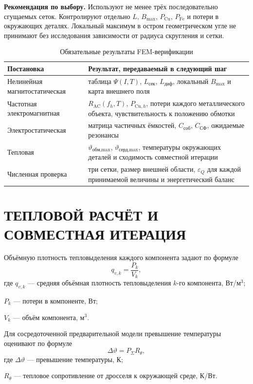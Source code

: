 \documentclass[14pt,a4paper]{extarticle}
\newcommand{\recommend}{\par\noindent\textbf{Рекомендация по выбору.} }
\begin{document}
\recommend Используют не менее трёх последовательно сгущаемых сеток.
Контролируют отдельно $L$, $B_{\max}$, $P_{\text{Cu}}$,
$P_{\text{Fe}}$ и потери в окружающих деталях. Локальный максимум в
остром геометрическом угле не принимают без исследования зависимости
от радиуса скругления и сетки.

\begin{table}[H]
\caption{Обязательные результаты FEM-верификации}
\label{tab:fem-results}
\centering
\small
\begin{tabularx}{\textwidth}{>{\raggedright\arraybackslash}p{50mm} X}
\toprule
Постановка & Результат, передаваемый в следующий шаг \\
\midrule
Нелинейная магнитостатическая &
таблица $\Psi(I,T)$, $L_{\text{сек}}$, $L_{\text{диф}}$, локальный
$B_{\max}$ и карта внешнего поля \\
Частотная электромагнитная &
$R_{\text{AC}}(f_h,T)$, $P_{\text{Cu},h}$, потери каждого металлического
объекта, чувствительность к положению обмотки \\
Электростатическая &
матрица частичных ёмкостей, $C_{\text{соб}}$, $C_{\text{СФ}}$, ожидаемые
резонансы \\
Тепловая &
$\vartheta_{\text{обм,max}}$, $\vartheta_{\text{серд,max}}$, температуры
окружающих деталей и сходимость совместной итерации \\
Численная проверка &
три сетки, размер внешней области, $\varepsilon_Q$ для каждой принимаемой
величины и энергетический баланс \\
\bottomrule
\end{tabularx}
\end{table}

\section{ТЕПЛОВОЙ РАСЧЁТ И СОВМЕСТНАЯ ИТЕРАЦИЯ}
\label{sec:thermal}

Объёмную плотность тепловыделения каждого компонента задают по формуле
\begin{equation}
 q_{v,k}=\frac{P_k}{V_k},
 \label{eq:heat-density}
\end{equation}
где $q_{v,k}$ --- средняя объёмная плотность тепловыделения $k$-го
компонента, Вт/м$^3$;\par\noindent
$P_k$ --- потери в компоненте, Вт;\par\noindent
$V_k$ --- объём компонента, м$^3$.

Для сосредоточенной предварительной модели превышение температуры
оценивают по формуле
\begin{equation}
 \Delta\vartheta=P_{\Sigma}R_{\theta},
 \label{eq:thermal-resistance}
\end{equation}
где $\Delta\vartheta$ --- превышение температуры, К;\par\noindent
$R_{\theta}$ --- тепловое сопротивление от дросселя к окружающей среде,
К/Вт.
\end{document}
